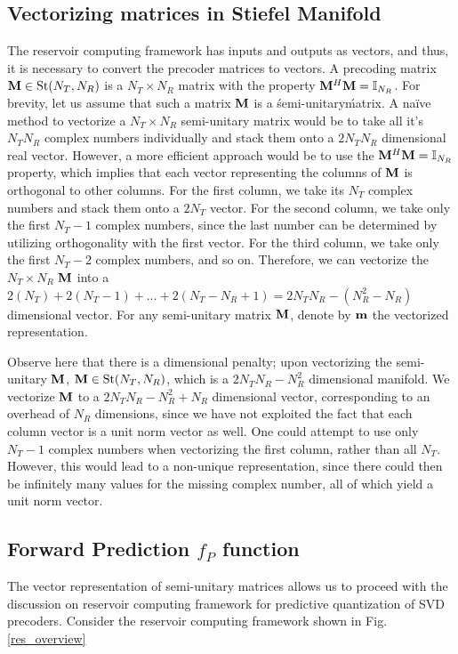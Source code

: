 \documentclass[conference]{IEEEtran}
\begin{document}
\subsection{Vectorizing matrices in Stiefel Manifold}
\label{vectorize}
The reservoir computing framework has inputs and outputs as vectors, and thus, it is necessary to convert the precoder matrices to vectors.
A precoding matrix $\mathcal{{\bf M}} \in \text{St}(N_T,N_R)$ is a $N_T\times N_R$ matrix with the property $\mathcal{{\bf M}}^H\mathcal{{\bf M}}=\mathbb{I}_{N_R}$.
For brevity, let us assume that such a matrix $\mathcal{{\bf M}}$ is a \'semi-unitary\' matrix.
A na{\"i}ve method to vectorize a $N_T\times N_R$ semi-unitary matrix would be to take all it's $N_TN_R$ complex numbers individually and stack them onto a $2N_TN_R$ dimensional real vector.
However, a more efficient approach would be to use the $\mathcal{{\bf M}}^H\mathcal{{\bf M}}=\mathbb{I}_{N_R}$ property, which implies that each vector representing the columns of $\mathcal{{\bf M}}$ is orthogonal to other columns.
For the first column, we take its $N_T$ complex numbers and stack them onto a $2N_T$ vector.
For the second column, we take only the first $N_T-1$ complex numbers, since the last number can be determined by utilizing orthogonality with the first vector.
For the third column, we take only the first $N_T-2$ complex numbers, and so on.
Therefore, we can vectorize the $N_T\times N_R$ $\mathcal{{\bf M}}$ into a $2(N_T)+2(N_T-1)+\ldots+2(N_T-N_R+1)= 2N_TN_R-(N_R^2-N_R)$ dimensional vector.
For any semi-unitary matrix $\mathcal{{\bf M}}$, denote by $\mathcal{{\bf m}}$ the vectorized representation.

Observe here that there is a dimensional penalty; upon vectorizing the semi-unitary $\mathcal{{\bf M}}$,
$\mathcal{{\bf M}} \in \text{St}(N_T,N_R)$, which is a $2N_TN_R-N_R^2$ dimensional manifold.
We vectorize $\mathcal{{\bf M}}$ to a $2N_TN_R-N_R^2+N_R$ dimensional vector, corresponding to an overhead of $N_R$ dimensions, since we have not exploited the fact that each column vector is a unit norm vector as well.
One could attempt to use only $N_T-1$ complex numbers when vectorizing the first column, rather than all $N_T$.
However, this would lead to a non-unique representation, since there could then be infinitely many values for the missing complex number, all of which yield a unit norm vector.
\subsection{Forward Prediction $f_P$ function}
\noindent The vector representation of semi-unitary matrices allows us to proceed with the discussion on reservoir computing framework for predictive quantization of SVD precoders.
Consider the reservoir computing framework shown in Fig. \ref{res_overview} %
\end{document}
